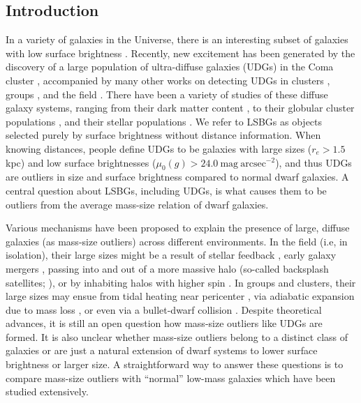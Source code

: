 \documentclass[twocolumn,astrosymb,twocolappendix,linenumbers]{aastex631}
\newcommand{\sbunit}{\mathrm{mag\ arcsec}^{-2}}
\newcommand{\sbcen}{\mu_{0}(g)}
\begin{document}
\begin{CJK*}{UTF8}{gbsn}
\section{Introduction} \label{sec:intro}
In a variety of galaxies in the Universe, there is an interesting subset of galaxies with low surface brightness \citep[dubbed low surface brightness galaxies or LSBGs, e.g.,][]{Sandage1984,Caldwell1987,Impey1988,McGaugh1995,Dalcanton1997a}. Recently, new excitement has been generated by the discovery of a large population of ultra-diffuse galaxies (UDGs) in the Coma cluster \citep{vanDokkum2015}, accompanied by many other works on detecting UDGs in clusters \citep[e.g.,][]{Koda2015,Mihos2015,Yagi2016,vdBurg2016,vdBurg2017,Lee2017,ManceraPina2018,Zaritsky2019,Danieli2019}, groups \citep[e.g.,][]{Roman2017b,Greco2018,SAGA-II,Roman2021,CarlstenELVES2022}, and the field \citep[e.g.,][]{Leisman2017,Roman2019,Prole2019,Tanoglidis2021,Kadowaki2021}. There have been a variety of studies of these diffuse galaxy systems, ranging from their dark matter content \citep[e.g.,][]{Mowla2017,vanDokkum2018,vanDokkum2019,Danieli2019DF2,Wasserman2019,ManceraPina2019b,Keim2022,ManceraPina2022,Kong2022}, to their globular cluster populations \citep[e.g.,][]{vanDokkum2017,Somalwar2020,Forbes2020,Danieli2022,Gannon2022,vanDokkum2022GC,Gannon2022}, and their stellar populations \citep[e.g.,][]{Gu2018,Ferre-Mateu2018,Pandya2018,Villaume2022}. We refer to LSBGs as objects selected purely by surface brightness without distance information. When knowing distances, people define UDGs to be galaxies with large sizes ($r_e > 1.5$ kpc) and low surface brightnesses ($\sbcen > 24.0\ \sbunit$), and thus UDGs are outliers in size and surface brightness compared to normal dwarf galaxies. A central question about LSBGs, including UDGs, is what causes them to be outliers from the average mass-size relation of dwarf galaxies.

Various mechanisms have been proposed to explain the presence of large, diffuse galaxies (as mass-size outliers) across different environments. In the field (i.e, in isolation), their large sizes might be a result of stellar feedback \citep{DiCintio2017,Chan2018}, early galaxy mergers \citep{Wright2021}, passing into and out of a more massive halo (so-called backsplash satellites; \citealt{Benavides2021}), or by inhabiting halos with higher spin \citep{Dalcanton1997,Amorisco2016,Liao2019,ManceraPina2020,Benavides2022,Kong2022}. In groups and clusters, their large sizes may ensue from tidal heating near pericenter \citep{Jiang2019}, via adiabatic expansion due to mass loss \citep{Tremmel2020}, or even via a bullet-dwarf collision \citep{vandokkum2022Nat,vanDokkum2022GC}. Despite theoretical advances, it is still an open question how mass-size outliers like UDGs are formed. It is also unclear whether mass-size outliers belong to a distinct class of galaxies or are just a natural extension of dwarf systems to lower surface brightness or larger size. A straightforward way to answer these questions is to compare mass-size outliers with ``normal'' low-mass galaxies which have been studied extensively. 


\end{CJK*}
\end{document}
